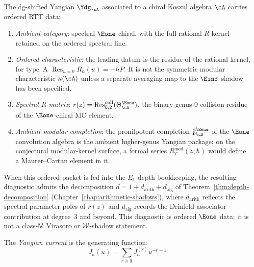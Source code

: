 \begin{construction}
\label{constr:yangian-shadow-archetype}
The dg-shifted Yangian $\Ydg_\cA$ associated to a chiral Koszul algebra $\cA$ carries ordered RTT data:
\begin{enumerate}[label=\textup{(\roman*)}]
\item \emph{Ambient category}: spectral $\Eone$-chiral, with the full
 rational $R$-kernel retained on the ordered spectral line.
\item \emph{Ordered characteristic}: the leading datum is the
 residue of the rational kernel, for type~A
 $\operatorname*{Res}_{u=0}R_\hbar(u)=-\hbar P$.  It is not the
 symmetric modular characteristic $\kappa(\cA)$ unless a separate
 averaging map to the $\Einf$ shadow has been specified.
\item \emph{Spectral $R$-matrix}: $r(z) = \mathrm{Res}^{\mathrm{coll}}_{0,2}(\Theta_\cA^{\Eone})$, the binary genus-$0$ collision residue of the $\Eone$-chiral MC element.
\item \emph{Ambient modular completion}: the pronilpotent completion $\hat{\mathfrak{g}}^{\Eone}_\cA$ of the $\Eone$ convolution algebra is the ambient higher-genus Yangian package; on the conjectural modular-kernel surface, a formal series $R^{\mathrm{mod}}_T(z;\hbar)$ would define a Maurer--Cartan element in it.
\end{enumerate}
When this ordered packet is fed into the $E_1$ depth bookkeeping, the
resulting diagnostic admits the decomposition
$d = 1 + d_{\mathrm{arith}} + d_{\mathrm{alg}}$ of
Theorem~\textup{\ref{thm:depth-decomposition}}
(Chapter~\textup{\ref{chap:arithmetic-shadows}}),
where $d_{\mathrm{arith}}$ reflects the spectral-parameter poles
of $r(z)$ and $d_{\mathrm{alg}}$ records the Drinfeld associator
contribution at degree~$3$ and beyond. This diagnostic is ordered
$\Eone$ data; it is not a class-$\mathsf{M}$ Virasoro or
$\mathcal W$-shadow statement.
\end{construction}

\begin{definition}\label{def:yangian-current}
The \emph{Yangian current} is the generating function:
\[
J_a(u) = \sum_{r \geq 0} J^{(r)}_a u^{-r-1}
\]
\end{definition}

